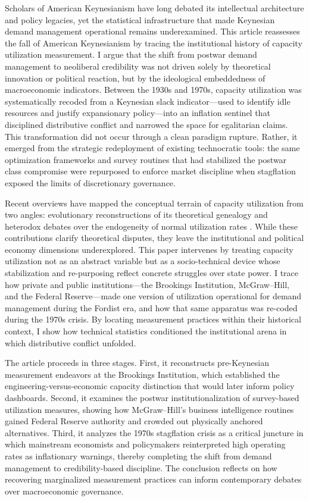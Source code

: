 \documentclass[11pt]{article}
\begin{document}
Scholars of American Keynesianism have long debated its intellectual architecture and policy legacies, yet the statistical infrastructure that made Keynesian demand management operational remains underexamined. This article reassesses the fall of American Keynesianism by tracing the institutional history of capacity utilization measurement. I argue that the shift from postwar demand management to neoliberal credibility was not driven solely by theoretical innovation or political reaction, but by the ideological embeddedness of macroeconomic indicators. Between the 1930s and 1970s, capacity utilization was systematically recoded from a Keynesian slack indicator---used to identify idle resources and justify expansionary policy---into an inflation sentinel that disciplined distributive conflict and narrowed the space for egalitarian claims. This transformation did not occur through a clean paradigm rupture. Rather, it emerged from the strategic redeployment of existing technocratic tools: the same optimization frameworks and survey routines that had stabilized the postwar class compromise were repurposed to enforce market discipline when stagflation exposed the limits of discretionary governance.

Recent overviews have mapped the conceptual terrain of capacity utilization from two angles: evolutionary reconstructions of its theoretical genealogy \citep{trezzinipignalosa2024} and heterodox debates over the endogeneity of normal utilization rates \citep{nikiforos2016}. While these contributions clarify theoretical disputes, they leave the institutional and political economy dimensions underexplored. This paper intervenes by treating capacity utilization not as an abstract variable but as a socio-technical device whose stabilization and re-purposing reflect concrete struggles over state power. I trace how private and public institutions---the Brookings Institution, McGraw--Hill, and the Federal Reserve---made one version of utilization operational for demand management during the Fordist era, and how that same apparatus was re-coded during the 1970s crisis. By locating measurement practices within their historical context, I show how technical statistics conditioned the institutional arena in which distributive conflict unfolded.

The article proceeds in three stages. First, it reconstructs pre-Keynesian measurement endeavors at the Brookings Institution, which established the engineering-versus-economic capacity distinction that would later inform policy dashboards. Second, it examines the postwar institutionalization of survey-based utilization measures, showing how McGraw--Hill's business intelligence routines gained Federal Reserve authority and crowded out physically anchored alternatives. Third, it analyzes the 1970s stagflation crisis as a critical juncture in which mainstream economists and policymakers reinterpreted high operating rates as inflationary warnings, thereby completing the shift from demand management to credibility-based discipline. The conclusion reflects on how recovering marginalized measurement practices can inform contemporary debates over macroeconomic governance.
\end{document}
